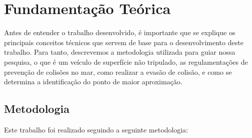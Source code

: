 


\chapter{Fundamentação Teórica}\label{chap2:fund_teo}
    Antes de entender o trabalho desenvolvido, é importante que se explique os principais conceitos técnicos que servem de base para o desenvolvimento deste trabalho. Para tanto, descrevemos a metodologia utilizada para guiar nossa pesquisa, o que é um veículo de superfície não tripulado, as regulamentações de prevenção de colisões no mar, como realizar a evasão de colisão, e como se determina a identificação do ponto de maior aproximação.
    
    
    \section{Metodologia}
       Este trabalho foi realizado seguindo a seguinte metodologia: 
        
